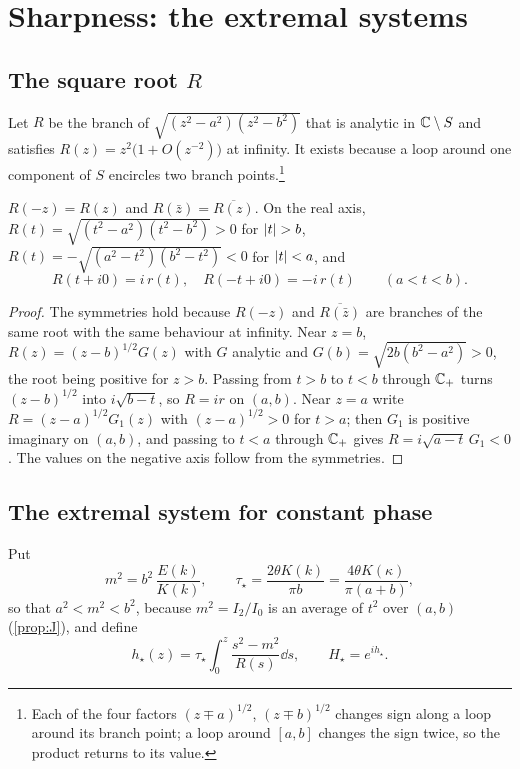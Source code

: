 \section{Sharpness: the extremal systems}\label{sec:extremal}

\subsection{The square root $R$}

Let $R$ be the branch of $\sqrt{(z^2-a^2)(z^2-b^2)}$ that is analytic in
$\mathbb C\setminus S$ and satisfies $R(z)=z^2\big(1+O(z^{-2})\big)$ at infinity. It
exists because a loop around one component of $S$ encircles two branch
points.\footnote{Each of the four factors $(z\mp a)^{1/2}$, $(z\mp b)^{1/2}$ changes sign along a loop around its branch point; a loop around $[a,b]$ changes the sign twice, so the product returns to its value.}

\begin{lemma}\label{lem:R}
$R(-z)=R(z)$ and $R(\bar z)=\overline{R(z)}$. On the real axis,
$R(t)=\sqrt{(t^2-a^2)(t^2-b^2)}>0$ for $\abs t>b$,
$R(t)=-\sqrt{(a^2-t^2)(b^2-t^2)}<0$ for $\left|t\right|<a$, and
\[
R(t+i0)=i\,r(t),\quad R(-t+i0)=-i\,r(t)\qquad(a<t<b).
\]
\end{lemma}

\begin{proof}
The symmetries hold because $R(-z)$ and $\overline{R(\bar z)}$ are branches of
the same root with the same behaviour at infinity. Near $z=b$,
$R(z)=(z-b)^{1/2}G(z)$ with $G$ analytic and $G(b)=\sqrt{2b(b^2-a^2)}>0$, the
root being positive for $z>b$. Passing from $t>b$ to $t<b$ through $\mathbb C_{+}$ turns
$(z-b)^{1/2}$ into $i\sqrt{b-t}$, so $R=ir$ on $(a,b)$. Near $z=a$ write
$R=(z-a)^{1/2}G_1(z)$ with $(z-a)^{1/2}>0$ for $t>a$; then $G_1$ is
positive imaginary on $(a,b)$, and passing to $t<a$ through $\mathbb C_{+}$ gives
$R=i\sqrt{a-t}\,G_1<0$. The values on the negative axis follow from the
symmetries.
\end{proof}

\subsection{The extremal system for constant phase}

Put
\begin{equation}\label{eq:m-tau}
m^2=b^2\,\frac{E(k)}{K(k)},\qquad
\tau_\star=\frac{2\theta K(k)}{\pi b}=\frac{4\theta K(\kappa)}{\pi(a+b)} ,
\end{equation}
so that $a^2<m^2<b^2$, because $m^2=I_2/I_0$ is an average of $t^2$ over
$(a,b)$ (\cref{prop:J}), and define
\begin{equation}\label{eq:hstar}
h_\star(z)=\tau_\star\int_0^z\frac{s^2-m^2}{R(s)}\dd s,\qquad H_\star=e^{ih_\star}.
\end{equation}


